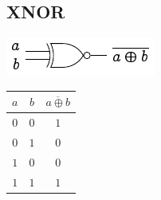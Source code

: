 \begin{multicols}{4}
	\subsection*{XNOR}
	\begin{minipage}[t][2em][c]{\linewidth}
		\centering
		\includegraphics{fig.xnor.pdf}
	\end{minipage}
	\begin{center}
		\begin{tabular}{cc|c}
			\toprule
			$a$ & $b$ & $\overline{a \oplus b}$ \\
			\midrule
			$0$ & $0$ & $1$                     \\
			$0$ & $1$ & $0$                     \\
			$1$ & $0$ & $0$                     \\
			$1$ & $1$ & $1$                     \\
			\bottomrule
		\end{tabular}
	\end{center}

\end{multicols}

